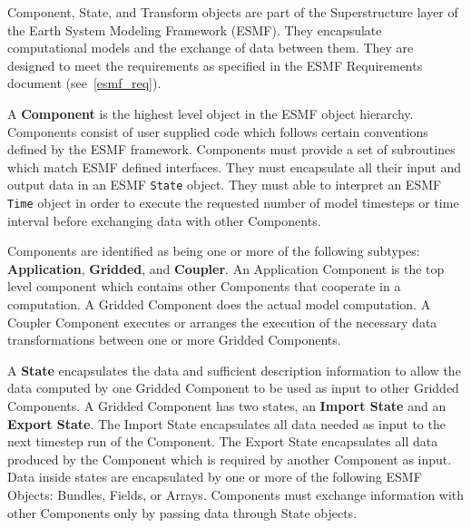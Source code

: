 %


Component, State, and Transform objects are part of the Superstructure 
layer of the Earth System Modeling Framework (ESMF).  They encapsulate
computational models and the exchange of data between them.
They are designed to meet the requirements as specified in the
ESMF Requirements document (see~\ref{esmf_req}).

A {\bf Component} 
is the highest level object in the ESMF object
hierarchy.  Components consist of user supplied code
which follows certain conventions defined by the ESMF framework. 
Components must provide a set of subroutines which match ESMF
defined interfaces. They must encapsulate
all their input and output data in an ESMF {\tt State} object.  They
must able to interpret an ESMF {\tt Time} object in order
to execute the requested number of model timesteps or time interval
before exchanging data with other Components.

Components are identified as being one or more of the
following subtypes: {\bf Application}, {\bf Gridded}, and {\bf Coupler}.  
An Application Component is the top level component which
contains other Components that cooperate in a computation. 
A Gridded Component
does the actual model computation.  A Coupler Component executes or
arranges the execution of the necessary data transformations between one
or more Gridded Components.


A {\bf State} 
encapsulates the data and sufficient description information
to allow the data computed by one Gridded Component to be
used as input to other Gridded Components.  A Gridded Component has
two states, an {\bf Import State} and an {\bf Export State}.
The Import State encapsulates all data needed as input to the
next timestep run of the Component.  The Export State encapsulates 
all data produced by the Component which is required by another
Component as input.  Data inside states are encapsulated by one 
or more of the following ESMF Objects: Bundles, Fields, or Arrays.
Components must exchange information with other Components
only by passing data through State objects.

